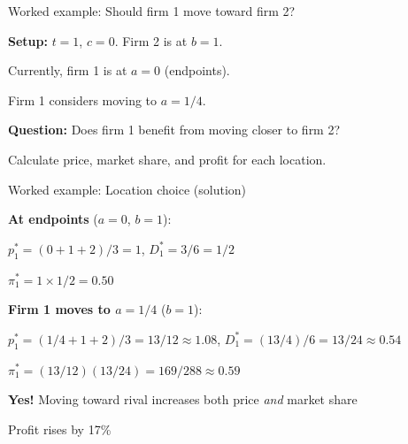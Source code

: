 \documentclass[notes,11pt, aspectratio=169]{beamer}
\newenvironment{wideitemize}{\itemize\addtolength{\itemsep}{10pt}}{\enditemize}
\begin{document}
\begin{frame}{Worked example: Should firm 1 move toward firm 2?}
	\begin{wideitemize}
		\item \textbf{Setup:} $t = 1$, $c = 0$. Firm 2 is at $b = 1$.
		\item Currently, firm 1 is at $a = 0$ (endpoints).
		\item Firm 1 considers moving to $a = 1/4$.
		\item \textbf{Question:} Does firm 1 benefit from moving closer to firm 2?
		\item Calculate price, market share, and profit for each location.
	\end{wideitemize}
\end{frame}

\begin{frame}{Worked example: Location choice (solution)}
	\begin{wideitemize}
		\item \textbf{At endpoints} ($a = 0$, $b = 1$):
		\begin{wideitemize}
			\vspace{3pt}
			\item $p_1^* = (0 + 1 + 2)/3 = 1$, \quad $D_1^* = 3/6 = 1/2$
			\item $\pi_1^* = 1 \times 1/2 = 0.50$
		\end{wideitemize}
		\item \textbf{Firm 1 moves to $a = 1/4$} ($b = 1$):
		\begin{wideitemize}
			\vspace{3pt}
			\item $p_1^* = (1/4 + 1 + 2)/3 = 13/12 \approx 1.08$, \quad $D_1^* = (13/4)/6 = 13/24 \approx 0.54$
			\item $\pi_1^* = (13/12)(13/24) = 169/288 \approx 0.59$
		\end{wideitemize}
		\item \textbf{Yes!} Moving toward rival increases both price \textit{and} market share
		\item Profit rises by 17\%
	\end{wideitemize}
\end{frame}
\end{document}
